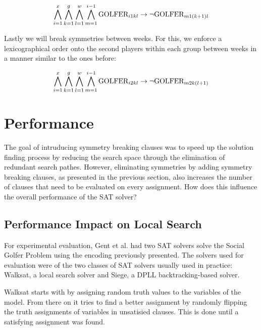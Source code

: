 \documentclass[a4paper]{scrartcl}
\begin{document}
\begin{equation}
\centering
    \bigwedge \limits_{i=1}^x
    \bigwedge \limits_{k=1}^g
    \bigwedge \limits_{l=1}^w
    \bigwedge \limits_{m=1}^{i-1}
    \text{GOLFER}_{i1kl}
    \to
    \neg \text{GOLFER}_{m1(k+1)l}
\end{equation}

Lastly we will break symmetries between weeks. For this, we enforce a lexicographical order onto the second players within each group between weeks in a manner similar to the ones before:

\begin{equation}
\centering
    \bigwedge \limits_{i=1}^x
    \bigwedge \limits_{k=1}^g
    \bigwedge \limits_{l=1}^w
    \bigwedge \limits_{m=1}^{i-1}
    \text{GOLFER}_{i2kl}
    \to
    \neg \text{GOLFER}_{m2k(l+1)}
\end{equation}


\section{Performance}

The goal of intruducing symmetry breaking clauses was to speed up the solution finding process by reducing the search space through the elimination of redundant search pathes. However, eliminating symmetries by adding symmetry breaking clauses, as presented in the previous section, also increases the number of clauses that need to be evaluated on every assignment. How does this influence the overall performance of the SAT solver?


\subsection{Performance Impact on Local Search}

For experimental evaluation, Gent et al.\cite{Gent05} had two SAT solvers solve the Social Golfer Problem using the encoding previously presented. The solvers used for evaluation were of the two classes of SAT solvers usually used in practice: Walksat\cite{walksat2004}, a local search solver and Siege\cite{Ryan04}, a DPLL backtracking-based solver.

Walksat starts with by assigning random truth values to the variables of the model. From there on it tries to find a better assignment by randomly flipping the truth assignments of variables in unsatisied clauses. This is done until a satisfying assignment was found.
\end{document}
